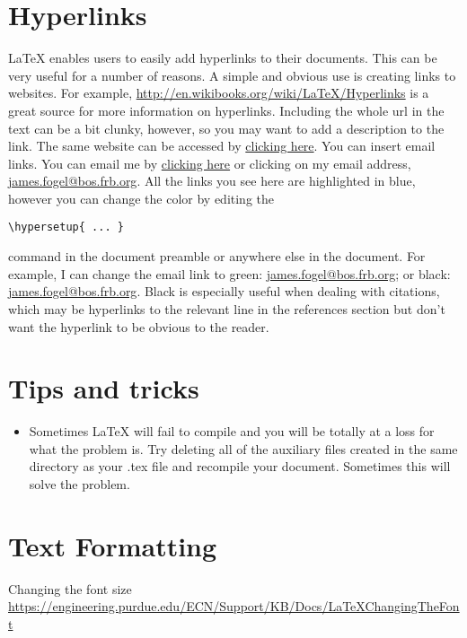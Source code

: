 \documentclass[11pt]{article}
\begin{document}
\clearpage

\section{Hyperlinks}

\LaTeX{} enables users to easily add hyperlinks to their documents. This can be very useful for a number of reasons. A simple and obvious use is creating links to websites. For example, \url{http://en.wikibooks.org/wiki/LaTeX/Hyperlinks} is a great source for more information on hyperlinks. Including the whole url in the text can be a bit clunky, however, so you may want to add a description to the link. The same website can be accessed by \href{http://en.wikibooks.org/wiki/LaTeX/Hyperlinks}{clicking here}. You can insert email links. You can email me by \href{mailto:james.fogel@bos.frb.org}{clicking here} or clicking on my email address, \href{mailto:james.fogel@bos.frb.org}{james.fogel@bos.frb.org}. All the links you see here are highlighted in blue, however you can change the color by editing the \begin{verbatim}\hypersetup{ ... }\end{verbatim} command in the document preamble or anywhere else in the document. For example, I can change the email link to green\hypersetup{urlcolor=green}: \href{mailto:james.fogel@bos.frb.org}{james.fogel@bos.frb.org}; or black: \hypersetup{urlcolor=black} \href{mailto:james.fogel@bos.frb.org}{james.fogel@bos.frb.org}. Black is especially useful when dealing with citations, which may be hyperlinks to the relevant line in the references section but don't want the hyperlink to be obvious to the reader.

\section{Tips and tricks}

\begin{itemize}
    \item Sometimes \LaTeX{} will fail to compile and you will be totally at a loss for what the problem is. Try deleting all of the auxiliary files created in the same directory as your .tex file and recompile your document. Sometimes this will solve the problem.
\end{itemize}

\section{Text Formatting}

Changing the font size \url{https://engineering.purdue.edu/ECN/Support/KB/Docs/LaTeXChangingTheFont}
\end{document}
